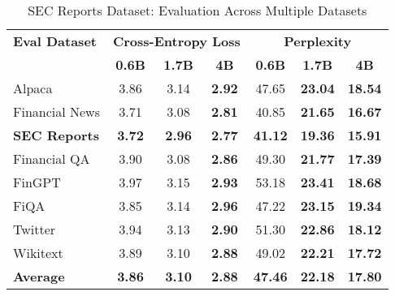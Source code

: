 
\begin{table}[h]
\centering
\caption[SEC Reports: Evaluation Results]{SEC Reports Dataset: Evaluation Across Multiple Datasets}
\label{tab:sec_reports_results}
\begin{tabular}{l|ccc|ccc}
\hline
\textbf{Eval Dataset} & \multicolumn{3}{c|}{\textbf{Cross-Entropy Loss}} & \multicolumn{3}{c}{\textbf{Perplexity}} \\
\cline{2-4} \cline{5-7}
  & \textbf{0.6B} & \textbf{1.7B} & \textbf{4B} & \textbf{0.6B} & \textbf{1.7B} & \textbf{4B} \\
\hline
Alpaca & 3.86 & 3.14 & \textbf{2.92} & 47.65 & \textbf{23.04} & \textbf{18.54} \\
Financial News & 3.71 & 3.08 & \textbf{2.81} & 40.85 & \textbf{21.65} & \textbf{16.67} \\
\textbf{SEC Reports} & \textbf{3.72} & \textbf{2.96} & \textbf{2.77} & \textbf{41.12} & \textbf{19.36} & \textbf{15.91} \\
Financial QA & 3.90 & 3.08 & \textbf{2.86} & 49.30 & \textbf{21.77} & \textbf{17.39} \\
FinGPT & 3.97 & 3.15 & \textbf{2.93} & 53.18 & \textbf{23.41} & \textbf{18.68} \\
FiQA & 3.85 & 3.14 & \textbf{2.96} & 47.22 & \textbf{23.15} & \textbf{19.34} \\
Twitter & 3.94 & 3.13 & \textbf{2.90} & 51.30 & \textbf{22.86} & \textbf{18.12} \\
Wikitext & 3.89 & 3.10 & \textbf{2.88} & 49.02 & \textbf{22.21} & \textbf{17.72} \\
\hline
\textbf{Average} & \textbf{3.86} & \textbf{3.10} & \textbf{2.88} & \textbf{47.46} & \textbf{22.18} & \textbf{17.80} \\
\hline
\end{tabular}
\end{table}
